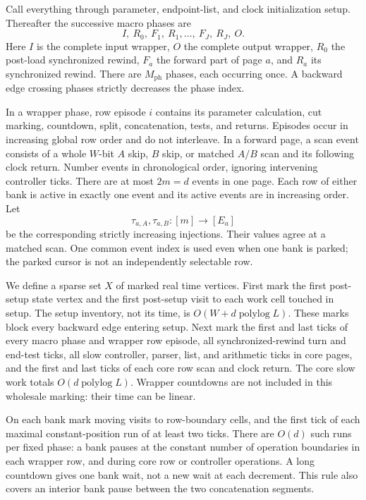 \begin{informalproof}
Call everything through parameter, endpoint-list, and clock initialization
setup.  Thereafter the successive macro phases are
\[
 I,\ R_0,\ F_1,\ R_1,\ldots,\ F_J,\ R_J,\ O.
\]
Here $I$ is the complete input wrapper, $O$ the complete output wrapper,
$R_0$ the post-load synchronized rewind, $F_a$ the forward part of page
$a$, and $R_a$ its synchronized rewind.  There are $M_{\mathrm{ph}}$ phases,
each occurring once.  A backward edge crossing phases strictly decreases
the phase index.

In a wrapper phase, row episode $i$ contains its parameter calculation,
cut marking, countdown, split, concatenation, tests, and returns.  Episodes
occur in increasing global row order and do not interleave.  In a forward
page, a scan event consists of a whole $W$-bit $A$ skip, $B$ skip, or
matched $A/B$ scan and its following clock return.  Number events in
chronological order, ignoring intervening controller ticks.  There are
at most $2m=d$ events in one page.  Each row of either bank is active in
exactly one event and its active events are in increasing order.  Let
\[
 \tau_{a,A},\tau_{a,B}:[m]\longrightarrow[E_a]
\]
be the corresponding strictly increasing injections.  Their values agree
at a matched scan.  One common event index is used even when one bank is
parked; the parked cursor is not an independently selectable row.

We define a sparse set $X$ of marked real time vertices.  First mark the
first post-setup state vertex and the first post-setup visit to each work
cell touched in setup.  The setup inventory, not its time, is
$O(W+d\operatorname{polylog}L)$.  These marks block every backward edge
entering setup.  Next mark the first and last ticks of every macro phase
and wrapper row episode, all synchronized-rewind turn and end-test ticks,
all slow controller, parser, list, and arithmetic ticks in core pages,
and the first and last ticks of each core row scan and clock return.
The core slow work totals $O(d\operatorname{polylog}L)$.  Wrapper countdowns
are not included in this wholesale marking: their time can be linear.

On each bank mark moving visits to row-boundary cells, and the first tick
of each maximal constant-position run of at least two ticks.  There are
$O(d)$ such runs per fixed phase: a bank pauses at the constant number of
operation boundaries in each wrapper row, and during core row or controller
operations.  A long countdown gives one bank wait, not a new wait at each
decrement.  This rule also covers an interior bank pause between the two
concatenation segments.


\end{informalproof}
